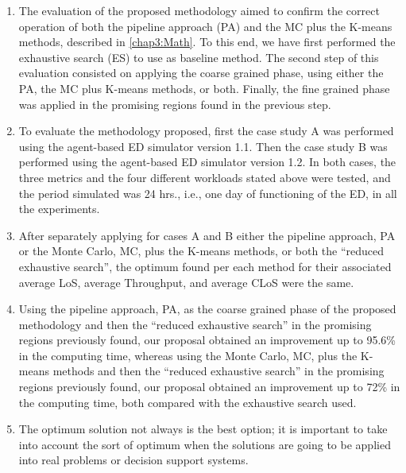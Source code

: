 \documentclass[11pt]{article} %
\begin{document}
\begin{enumerate}
\item The evaluation of the proposed methodology aimed to confirm the correct
operation of both the pipeline approach (PA) and the MC plus the K-means
methods, described in \ref{chap3:Math}. To this end, we have first
performed the exhaustive search (ES) to use as baseline method. The
second step of this evaluation consisted on applying the coarse grained
phase, using either the PA, the MC plus K-means methods, or both.
Finally, the fine grained phase was applied in the promising regions
found in the previous step.\\

\item To evaluate the methodology proposed, first the case study A was performed
using the agent-based ED simulator version 1.1. Then the case study
B was performed using the agent-based ED simulator version 1.2. In
both cases, the three metrics and the four different workloads stated
above were tested, and the period simulated was 24 hrs., i.e., one
day of functioning of the ED, in all the experiments.\\

\item After separately applying for cases A and B either the pipeline approach,
PA or the Monte Carlo, MC, plus the K-means methods, or both the \textquotedblleft{}reduced
exhaustive search\textquotedblright{}, the optimum found per each
method for their associated average LoS, average Throughput, and average
CLoS were the same.\\

\item Using the pipeline approach, PA, as the coarse grained phase of the
proposed methodology and then the \textquotedblleft{}reduced exhaustive
search\textquotedblright{} in the promising regions previously found,
our proposal obtained an improvement up to 95.6\% in the computing
time, whereas using the Monte Carlo, MC, plus the K-means methods
and then the \textquotedblleft{}reduced exhaustive search\textquotedblright{}
in the promising regions previously found, our proposal obtained an
improvement up to 72\% in the computing time, both compared with the
exhaustive search used.
\item The optimum solution not always is the best option; it is important
to take into account the sort of optimum when the solutions are going
to be applied into real problems or decision support systems.
\end{enumerate}
\end{document}
